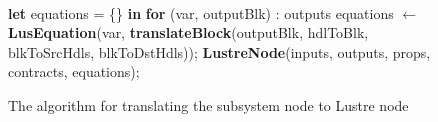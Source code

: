 \documentclass{article}
\begin{document}
\begin{figure}
\begin{algorithmic}
\\
\State \textbf{let} equations = \{\} \textbf{in}
\State \textbf{for} (var, outputBlk) : outputs
\State {\ \ \ \ } equations $\leftarrow$ \textbf{LusEquation}(var, \textbf{translateBlock}(outputBlk, \State {\ \ \ \ \ \ \ \ \ \ \ \ \ \ \ \ \ \ \ \ \ \ \ \ \ \ \ \ \ \ \ \ \ \ \ \ \ \ \ \ \ \ \ \ \ \ \ \ } hdlToBlk, blkToSrcHdls, blkToDstHdls));
\State \textbf{LustreNode}(inputs, outputs, props, contracts, equations);
\EndFunction
\end{algorithmic}
\label{translatenode}
\caption{The algorithm for translating the subsystem node to Lustre node}
\end{figure}
\end{document}
